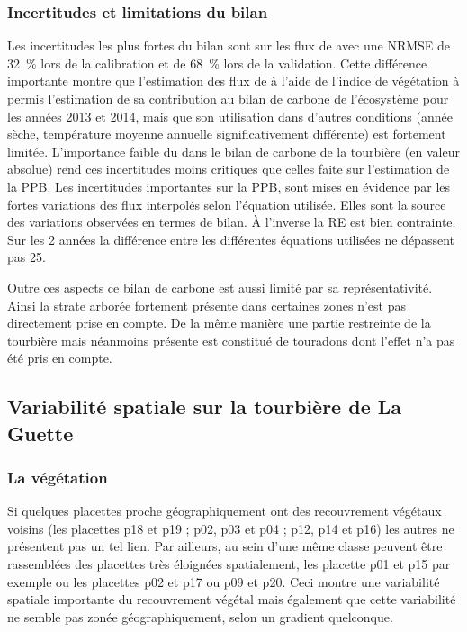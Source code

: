 \subsubsection{Incertitudes et limitations du bilan}
Les incertitudes les plus fortes du bilan sont sur les flux de \chh avec une NRMSE de \SI{32}{\percent} lors de la calibration et de \SI{68}{\percent} lors de la validation.
Cette différence importante montre que l'estimation des flux de \chh à l'aide de l'indice de végétation à permis l'estimation de sa contribution au bilan de carbone de l'écosystème pour les années 2013 et 2014, mais que son utilisation dans d'autres conditions (année sèche, température moyenne annuelle significativement différente) est fortement limitée.
L'importance faible du \chh dans le bilan de carbone de la tourbière (en valeur absolue) rend ces incertitudes moins critiques que celles faite sur l'estimation de la PPB.
Les incertitudes importantes sur la PPB, sont mises en évidence par les fortes variations des flux interpolés selon l'équation utilisée.
Elles sont la source des variations observées en termes de bilan.
À l'inverse la RE est bien contrainte.
Sur les 2 années la différence entre les différentes équations utilisées ne dépassent pas \SI{25}{\gcma}.

Outre ces aspects ce bilan de carbone est aussi limité par sa représentativité. 
Ainsi la strate arborée fortement présente dans certaines zones n'est pas directement prise en compte.
De la même manière une partie restreinte de la tourbière mais néanmoins présente est constitué de touradons dont l'effet n'a pas été pris en compte. %

\subsection{Variabilité spatiale sur la tourbière de La Guette}

\subsubsection{La végétation}

Si quelques placettes proche géographiquement ont des recouvrement végétaux voisins (les placettes p18 et p19 ; p02, p03 et p04 ; p12, p14 et p16) les autres ne présentent pas un tel lien.
Par ailleurs, au sein d'une même classe peuvent être rassemblées des placettes très éloignées spatialement, les placette p01 et p15 par exemple ou les placettes p02 et p17 ou p09 et p20.
Ceci montre une variabilité spatiale importante du recouvrement végétal mais également que cette variabilité ne semble pas zonée géographiquement, selon un gradient quelconque.

